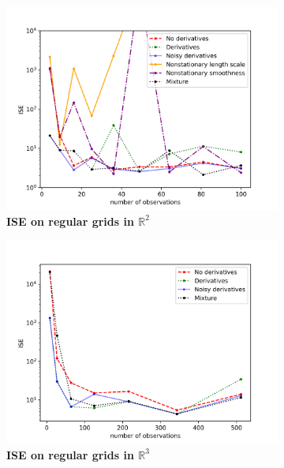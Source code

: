 \documentclass{article}
\newcommand{\R}{\mathbb{R}}
\numberwithin{equation}{section}
\begin{document}
\begin{figure}
\begin{subfigure}[t]{.33\textwidth}
      \includegraphics[scale=0.35]{figures/crazy-2D.png}
      \caption{\textbf{ISE on regular grids in $\R^2$}}
    \end{subfigure}
    \begin{subfigure}[t]{.4\textwidth}
      \centering
      \includegraphics[scale=0.35]{figures/crazy-3D.png}
      \caption{\textbf{ISE on regular grids in $\R^3$}}
    \end{subfigure}%
    \begin{subfigure}[t]{.4\textwidth}
      \centering

\end{subfigure}
\end{figure}
\end{document}
